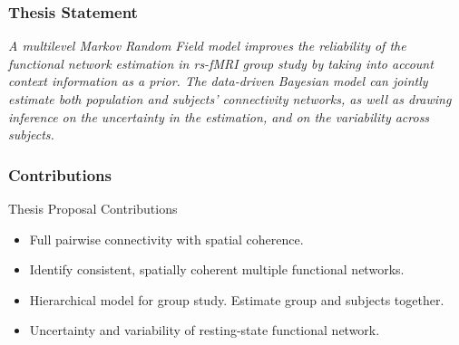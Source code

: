 \documentclass[serif]{beamer}
\begin{document}
\begin{frame}
\frametitle{Thesis Statement} 
\begin{block}{}
  \emph{A multilevel Markov Random Field model improves the reliability of the
  functional network estimation in rs-fMRI group study by taking into account
  context information as a prior. The data-driven Bayesian model can jointly
  estimate both population and subjects' connectivity networks, as well as
  drawing inference on the uncertainty in the estimation, and on the variability
  across subjects. }
  \end{block}
\end{frame}
\begin{frame}
  \frametitle{Contributions}
  \begin{block}{Thesis Proposal Contributions}
    \begin{itemize}
    \item Full pairwise connectivity with spatial coherence.
    \item Identify consistent, spatially coherent multiple functional networks.
    \item Hierarchical model for group study. Estimate group and subjects together.
    \item Uncertainty and variability of resting-state functional network.
    \end{itemize}
  \end{block}
\end{frame}
\end{document}
